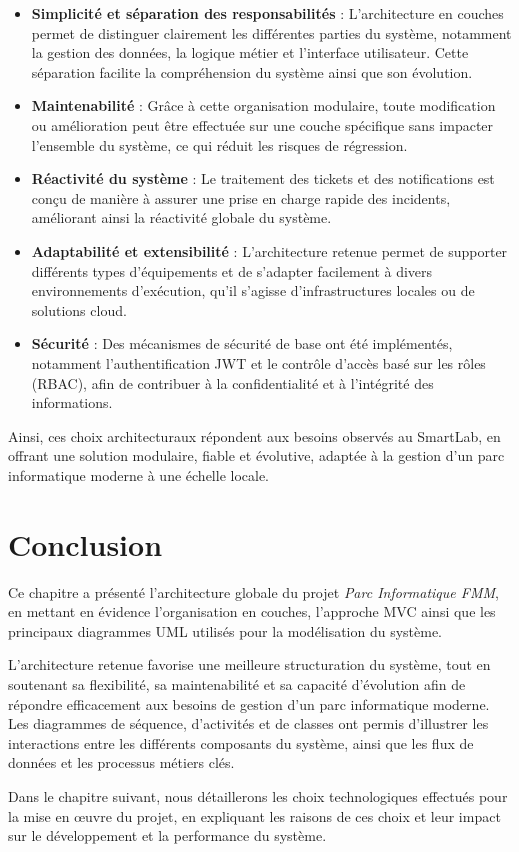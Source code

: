 \begin{itemize}
    \item \textbf{Simplicité et séparation des responsabilités} : L’architecture en couches permet de distinguer clairement les différentes parties du système, notamment la gestion des données, la logique métier et l’interface utilisateur. Cette séparation facilite la compréhension du système ainsi que son évolution.

    \item \textbf{Maintenabilité} : Grâce à cette organisation modulaire, toute modification ou amélioration peut être effectuée sur une couche spécifique sans impacter l’ensemble du système, ce qui réduit les risques de régression.

    \item \textbf{Réactivité du système} : Le traitement des tickets et des notifications est conçu de manière à assurer une prise en charge rapide des incidents, améliorant ainsi la réactivité globale du système.

    \item \textbf{Adaptabilité et extensibilité} : L’architecture retenue permet de supporter différents types d’équipements et de s’adapter facilement à divers environnements d’exécution, qu’il s’agisse d’infrastructures locales ou de solutions cloud.

    \item \textbf{Sécurité} : Des mécanismes de sécurité de base ont été implémentés, notamment l’authentification JWT et le contrôle d’accès basé sur les rôles (RBAC), afin de contribuer à la confidentialité et à l’intégrité des informations.
\end{itemize}

Ainsi, ces choix architecturaux répondent aux besoins observés au SmartLab, en offrant une solution modulaire, fiable et évolutive, adaptée à la gestion d’un parc informatique moderne à une échelle locale.
\section*{Conclusion}
\label{sec:conclusion}

Ce chapitre a présenté l’architecture globale du projet \textit{Parc Informatique FMM}, en mettant en évidence l’organisation en couches, l’approche MVC ainsi que les principaux diagrammes UML utilisés pour la modélisation du système.

L’architecture retenue favorise une meilleure structuration du système, tout en soutenant sa flexibilité, sa maintenabilité et sa capacité d’évolution afin de répondre efficacement aux besoins de gestion d’un parc informatique moderne. Les diagrammes de séquence, d’activités et de classes ont permis d’illustrer les interactions entre les différents composants du système, ainsi que les flux de données et les processus métiers clés.

Dans le chapitre suivant, nous détaillerons les choix technologiques effectués pour la mise en œuvre du projet, en expliquant les raisons de ces choix et leur impact sur le développement et la performance du système.



